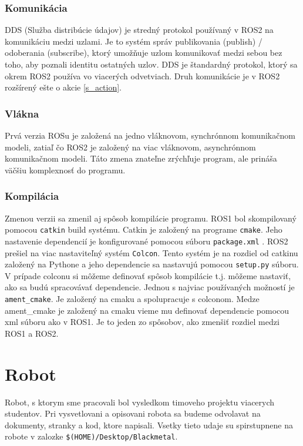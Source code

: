 \subsubsection{Komunikácia}

	DDS (Služba distribúcie údajov) je stredný protokol používaný v ROS2 na komunikáciu medzi uzlami. Je to systém správ
	publikovania (publish) / odoberania (subscribe), ktorý umožňuje uzlom komunikovať medzi sebou bez toho, aby poznali identitu ostatných uzlov. DDS je
	štandardný protokol, ktorý sa okrem ROS2 používa vo viacerých odvetviach. \cite{chatgpt} Druh komunikácie je v ROS2 rozšírený ešte o akcie \ref{s_action}.

\subsubsection{Vlákna}

	Prvá verzia ROSu je založená na jedno vláknovom, synchrónnom komunikačnom modeli, zatiaľ čo ROS2 je založený na viac vláknovom, asynchrónnom
	komunikačnom modeli. Táto zmena znateľne zrýchľuje program, ale prináša väčšiu komplexnosť do programu.

\subsubsection{Kompilácia}

	Zmenou verzii sa zmenil aj spôsob kompilácie programu. ROS1 bol skompilovaný pomocou \texttt{catkin} build systému. Catkin je založený na programe
	\texttt{cmake}. Jeho nastavenie dependencií je konfigurované pomocou súboru \texttt{package.xml} . ROS2 prešiel na viac nastaviteľný systém \texttt{Colcon}.
	Tento systém je na rozdiel od catkinu založený na Pythone a jeho dependencie sa nastavujú pomocou \texttt{setup.py} súboru. V prípade colconu si môžeme definovať
	spôsob kompilácie t.j. môžeme nastaviť, ako sa budú spracovávať dependencie. Jednou s najviac používaných možností je \texttt{ament\_cmake}. Je založený
	na cmaku a spolupracuje s colconom. Medze ament\_cmake je založený na cmaku vieme mu definovať dependencie pomocou xml súboru ako v ROS1. Je to jeden zo spôsobov,
	ako zmenšiť rozdiel medzi ROS1 a ROS2.

\section{Robot}

Robot, s ktorym sme pracovali bol vysledkom timoveho projektu viacerych studentov. Pri vysvetlovani a opisovani robota sa budeme odvolavat na dokumenty, stranky a kod,
ktore napisali. Vsetky tieto udaje su spirstupnene na robote v zalozke \texttt{\$(HOME)/Desktop/Blackmetal}. \cite{timovyProjekt}

